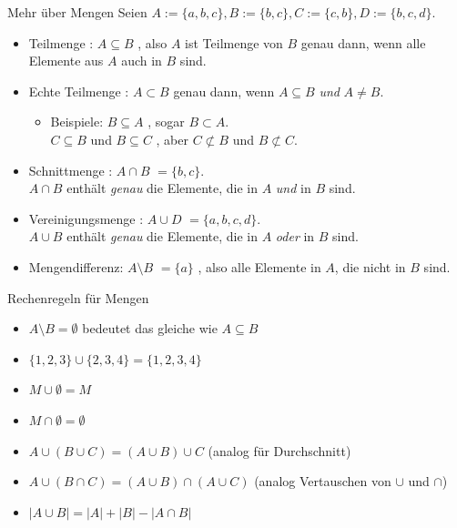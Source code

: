 \documentclass{beamer}
\begin{document}
\begin{frame}{Mehr über Mengen}
	  Seien $A := \{a, b, c\}, B:= \{b, c\}, C:= \{c, b\}, D := \{b, c, d\}$.
	
	\begin{itemize}
		\item Teilmenge  : $A \subseteq B$  , also $A$ ist Teilmenge von $B$   genau dann, wenn alle Elemente aus $A$ auch in $B$ sind.
		\item Echte Teilmenge  : $A \subset B$   genau dann, wenn $A \subseteq B$   \emph{und} $A \neq B$.
		\begin{itemize}
			\item Beispiele:   $B \subseteq A$  , sogar $B \subset A$.\\   $C \subseteq B$   und $B \subseteq C$  , aber $C \not\subset B$ und $B \not\subset C$.
		\end{itemize}
		\item Schnittmenge  : $A \cap B$   $ = \{b, c\}$.  \\ $A \cap B$ enthält \emph{genau} die Elemente, die in $A$ \emph{und} in $B$ sind.
		\item Vereinigungsmenge  : $A \cup D$   $ = \{a, b, c, d\}$.  \\ $A \cup B$ enthält \emph{genau} die Elemente, die in $A$ \emph{oder} in $B$ sind.
		\item Mengendifferenz:   $A \setminus B$   $ = \{a\}$  , also alle Elemente in $A$, die nicht in $B$ sind.  
	\end{itemize}
\end{frame}

\begin{frame}{Rechenregeln für Mengen}
	\begin{itemize}
			\item $A \setminus B = \emptyset$  bedeutet das gleiche wie $A \subseteq B$
			\item $ \{1, 2, 3\} \cup \{2, 3, 4\} = \{1, 2, 3, 4\}$
			\item $ M \cup \emptyset = M $
			\item $ M \cap \emptyset = \emptyset $
			\item $ A \cup (B \cup C) = (A \cup B) \cup C $ (analog für Durchschnitt)
			\item $ A \cup (B \cap C) = (A \cup B) \cap (A \cup C) $ (analog Vertauschen von $\cup$ und $\cap$)
			\item $|A \cup B| = |A| + |B| - |A \cap B|$
	\end{itemize}
\end{frame}
\end{document}
